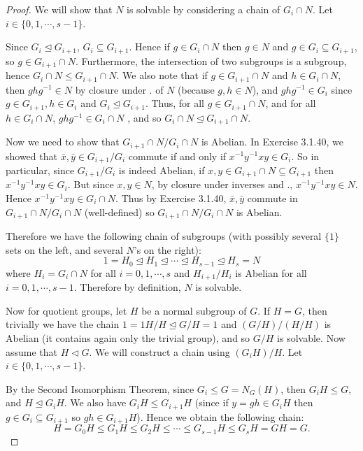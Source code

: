 \documentclass[10pt]{article}
\newcommand{\normsubeq}{\trianglelefteq}
\newcommand{\normsub}{\triangleleft}
\newcommand\inv{^{-1}}
\begin{document}
\begin{itemize}
\begin{proof}
We will show that $N$ is solvable by considering a chain of $G_i
\cap N$. Let $i \in \{0,1,\cdots, s-1 \}$.

Since $G_i \normsubeq G_{i+1}$, $G_i \subseteq G_{i+1}$. Hence if $g
\in G_i \cap N$ then $g \in N$ and $g \in G_i \subseteq G_{i+1}$, so
$g \in G_{i+1} \cap N$. Furthermore, the intersection of two
subgroups is a subgroup, hence $G_i \cap N \leq G_{i+1} \cap N$. We
also note that if $g \in G_{i+1} \cap N$ and $h \in G_{i} \cap N$,
then $ghg\inv \in N$ by closure under . of $N$ (because $g,h \in
N$), and $ghg\inv \in G_i$ since $g \in G_{i+1}, h \in G_i$ and $G_i
\normsubeq G_{i+1}$. Thus, for all $g \in G_{i+1} \cap N$, and for
all $h \in G_i \cap N$, $ghg\inv \in G_i \cap N$ , and so $G_i \cap
N \normsubeq G_{i+1} \cap N$.

Now we need to show that $G_{i+1} \cap N / G_i \cap N$ is Abelian.
In Exercise 3.1.40, we showed that $\bar{x}, \bar{y} \in
G_{i+1}/G_i$ commute if and only if $x\inv{y}\inv xy \in G_i$. So in
particular, since $G_{i+1}/G_i$ is indeed Abelian, if $x,y \in
G_{i+1} \cap N \subseteq G_{i+1}$ then ${x}\inv{y}\inv xy \in G_i$.
But since $x,y \in N$, by closure under inverses and .,
${x}\inv{y}\inv xy \in N$. Hence ${x}\inv{y}\inv xy \in G_i \cap N$.
Thus by Exercise 3.1.40, $\bar{x}, \bar{y}$ commute in $G_{i+1} \cap
N / G_i \cap N$ (well-defined) so $G_{i+1} \cap N / G_i \cap N$ is
Abelian.

Therefore we have the following chain of subgroups (with possibly
several $\{1\}$ sets on the left, and several $N$'s on the right):
\begin{equation*}
1=H_0 \normsubeq H_1 \normsubeq \cdots \normsubeq H_{s-1} \normsubeq
H_s=N
\end{equation*}
where $H_i= G_i \cap N$ for all $i=0,1, \cdots, s$ and $H_{i+1}/H_i$
is Abelian for all $i=0,1, \cdots, s-1$. Therefore by definition,
$N$ is solvable.

Now for quotient groups, let $H$ be a normal subgroup of $G$. If
$H=G$, then trivially we have the chain $1=1H/H \normsubeq G/H= 1$
and $(G/H)/(H/H)$ is Abelian (it contains again only the trivial
group), and so $G/H$ is solvable. Now assume that $H \normsub G$. We
will construct a chain using $(G_iH)/H$. Let $i \in
\{0,1,\cdots,s-1\}$.

By the Second Isomorphism Theorem, since $G_i \leq G=N_G(H)$, then
$G_iH \leq G$, and $H \normsubeq G_iH$. We also have $G_iH \leq
G_{i+1}H$ (since if $y=gh \in G_iH$ then $g \in G_i \subseteq
G_{i+1}$ so $gh \in G_{i+1}H$). Hence we obtain the following chain:
$$H=G_0H \leq G_1H \leq G_2H \leq \cdots \leq G_{s-1}H \leq G_sH=GH=G. $$


\end{proof}
\end{itemize}
\end{document}
